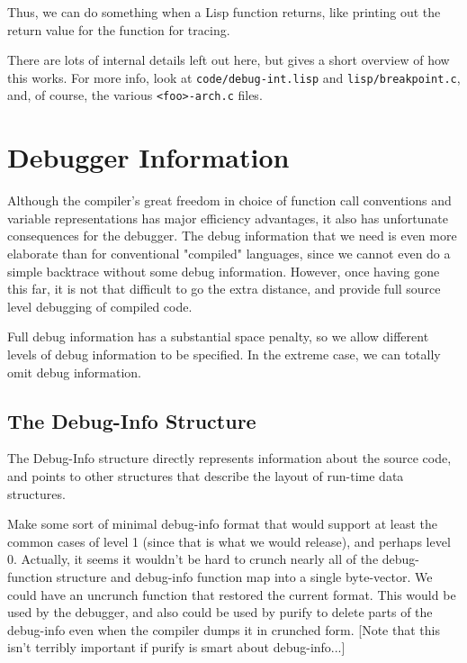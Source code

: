 Thus, we can do something when a Lisp function returns, like printing
out the return value for the function for tracing.

There are lots of internal details left out here, but gives a short
overview of how this works.  For more info, look at
\verb+code/debug-int.lisp+ and \verb+lisp/breakpoint.c+, and, of
course, the various \verb+<foo>-arch.c+ files.

\chapter{Debugger Information}
\label{debug-info}

Although the compiler's great freedom in choice of function call conventions
and variable representations has major efficiency advantages, it also has
unfortunate consequences for the debugger.  The debug information that we need
is even more elaborate than for conventional "compiled" languages, since we
cannot even do a simple backtrace without some debug information.  However,
once having gone this far, it is not that difficult to go the extra distance,
and provide full source level debugging of compiled code.

Full debug information has a substantial space penalty, so we allow different
levels of debug information to be specified.  In the extreme case, we can
totally omit debug information.


\section{The Debug-Info Structure}

The Debug-Info structure directly represents information about the
source code, and points to other structures that describe the layout of
run-time data structures.


Make some sort of minimal debug-info format that would support at least the
common cases of level 1 (since that is what we would release), and perhaps
level 0.  Actually, it seems it wouldn't be hard to crunch nearly all of the
debug-function structure and debug-info function map into a single byte-vector.
We could have an uncrunch function that restored the current format.  This
would be used by the debugger, and also could be used by purify to delete parts
of the debug-info even when the compiler dumps it in crunched form.
[Note that this isn't terribly important if purify is smart about
debug-info...]


